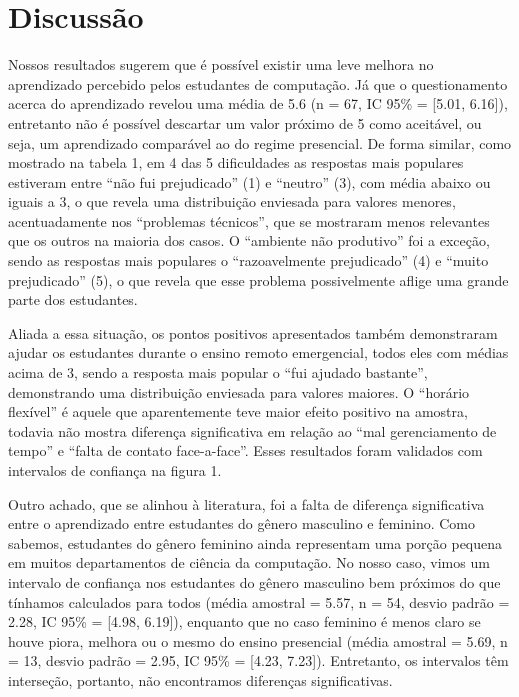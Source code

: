 \documentclass[
  12pt,
  portuguese,
]{article}
\begin{document}
\hypertarget{discussuxe3o}{%
\section{Discussão}\label{discussuxe3o}}

Nossos resultados sugerem que é possível existir uma leve melhora no
aprendizado percebido pelos estudantes de computação. Já que o
questionamento acerca do aprendizado revelou uma média de 5.6 (n = 67,
IC 95\% = {[}5.01, 6.16{]}), entretanto não é possível descartar um
valor próximo de 5 como aceitável, ou seja, um aprendizado comparável ao
do regime presencial. De forma similar, como mostrado na tabela 1, em 4
das 5 dificuldades as respostas mais populares estiveram entre ``não fui
prejudicado'' (1) e ``neutro'' (3), com média abaixo ou iguais a 3, o
que revela uma distribuição enviesada para valores menores,
acentuadamente nos ``problemas técnicos'', que se mostraram menos
relevantes que os outros na maioria dos casos. O ``ambiente não
produtivo'' foi a exceção, sendo as respostas mais populares o
``razoavelmente prejudicado'' (4) e ``muito prejudicado'' (5), o que
revela que esse problema possivelmente aflige uma grande parte dos
estudantes.

Aliada a essa situação, os pontos positivos apresentados também
demonstraram ajudar os estudantes durante o ensino remoto emergencial,
todos eles com médias acima de 3, sendo a resposta mais popular o ``fui
ajudado bastante'', demonstrando uma distribuição enviesada para valores
maiores. O ``horário flexível'' é aquele que aparentemente teve maior
efeito positivo na amostra, todavia não mostra diferença significativa
em relação ao ``mal gerenciamento de tempo'' e ``falta de contato
face-a-face''. Esses resultados foram validados com intervalos de
confiança na figura 1.

Outro achado, que se alinhou à literatura, foi a falta de diferença
significativa entre o aprendizado entre estudantes do gênero masculino e
feminino. Como sabemos, estudantes do gênero feminino ainda representam
uma porção pequena em muitos departamentos de ciência da computação. No
nosso caso, vimos um intervalo de confiança nos estudantes do gênero
masculino bem próximos do que tínhamos calculados para todos (média
amostral = 5.57, n = 54, desvio padrão = 2.28, IC 95\% = {[}4.98,
6.19{]}), enquanto que no caso feminino é menos claro se houve piora,
melhora ou o mesmo do ensino presencial (média amostral = 5.69, n = 13,
desvio padrão = 2.95, IC 95\% = {[}4.23, 7.23{]}). Entretanto, os
intervalos têm interseção, portanto, não encontramos diferenças
significativas.
\end{document}
